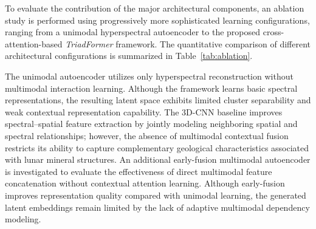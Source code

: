 \documentclass[pdflatex,sn-mathphys-num]{sn-jnl}
\begin{document}
To evaluate the contribution of the major architectural components, an ablation study is performed using progressively more sophisticated learning configurations, ranging from a unimodal hyperspectral autoencoder to the proposed cross-attention-based \textit{TriadFormer} framework. The quantitative comparison of different architectural configurations is summarized in Table~\ref{tab:ablation}.

\begin{table}[t]
\centering
\caption{Ablation study evaluating the contribution of different architectural components in the proposed TriadFormer framework.}
\label{tab:ablation}
\renewcommand{\arraystretch}{1.2}
\end{table}

The unimodal autoencoder utilizes only hyperspectral reconstruction without multimodal interaction learning. Although the framework learns basic spectral representations, the resulting latent space exhibits limited cluster separability and weak contextual representation capability. The 3D-CNN baseline improves spectral--spatial feature extraction by jointly modeling neighboring spatial and spectral relationships; however, the absence of multimodal contextual fusion restricts its ability to capture complementary geological characteristics associated with lunar mineral structures. An additional early-fusion multimodal autoencoder is investigated to evaluate the effectiveness of direct multimodal feature concatenation without contextual attention learning. Although early-fusion improves representation quality compared with unimodal learning, the generated latent embeddings remain limited by the lack of adaptive multimodal dependency modeling.
\end{document}
